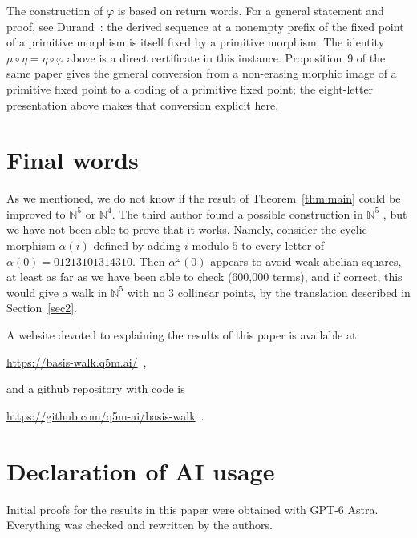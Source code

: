 \documentclass[12pt,reqno]{article}
\newcommand{\N}{\mathbb N}
\begin{document}
The construction of $\varphi$ is based on return words.
For a general statement and proof, see Durand~\cite[Proposition~19]{Dur98}:
the derived sequence at a nonempty prefix of the fixed point of a primitive morphism
is itself fixed by a primitive morphism. The identity
$\mu\circ\eta=\eta\circ\varphi$ above is a direct certificate in this instance.
Proposition~9 of the same paper gives the general conversion from a
non-erasing morphic image of a primitive fixed point to a coding of
a primitive fixed point; the eight-letter presentation above makes
that conversion explicit here. 

\section{Final words}

As we mentioned, we do not know if the result of Theorem~\ref{thm:main} could be improved to $\N^5$ or $\N^4$.  The third author found a possible construction in $\N^5$ 
\cite{Sha26},
but we have not been able to prove that it works.  Namely, consider the cyclic
morphism $\alpha(i)$ defined by adding $i$ modulo $5$
to every letter of $\alpha(0)=01213101314310$.  Then $\alpha^\omega (0)$ appears
to avoid weak abelian squares, at least as far as we have been able to check (600,000 terms), and if correct, this would give a walk in $\N^5$ with no $3$ collinear points, by the translation described in Section~\ref{sec2}.

A website devoted to explaining the results of this paper is available at\\
\centerline{\url{https://basis-walk.q5m.ai/}\, ,} and a github repository with code is\\
\centerline{\url{https://github.com/q5m-ai/basis-walk}\, .}

\section*{Declaration of AI usage}

Initial proofs for the results in this paper were obtained with GPT-6 Astra. Everything was checked and rewritten by the authors.
\end{document}
